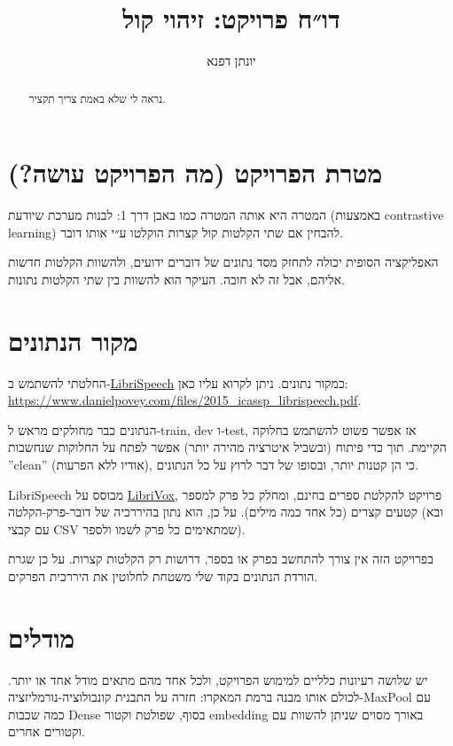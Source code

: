 \documentclass[a4paper]{article}
\title{דו״ח פרויקט: זיהוי קול}
\author{יונתן דפנא}
\begin{document}
\maketitle

\begin{abstract}
  נראה לי שלא באמת צריך תקציר.
\end{abstract}

\section{מטרת הפרויקט (מה הפרויקט עושה?)}
\label{sec:whatisit}

המטרה היא אותה המטרה כמו באבן דרך 1: לבנות מערכת שיודעת (באמצעות
contrastive learning) להבחין אם שתי הקלטות קול קצרות הוקלטו ע״י אותו
דובר.

האפליקציה הסופית יכולה לתחזק מסד נתונים של דוברים ידועים, ולהשוות
הקלטות חדשות אליהם, אבל זה לא חובה. העיקר הוא להשוות בין שתי הקלטות
נתונות.

\section{מקור הנתונים}
\label{sec:dataset}

החלטתי להשתמש ב-\href{https://www.openslr.org/12}{LibriSpeech} כמקור
נתונים. ניתן לקרוא עליו כאן:
\url{https://www.danielpovey.com/files/2015_icassp_librispeech.pdf}.

הנתונים כבר מחולקים מראש ל-train, dev ו-test, אז אפשר פשוט להשתמש
בחלוקה הקיימת. תוך כדי פיתוח (ובשביל איטרציה מהירה יותר) אפשר לפתח על
החלוקות שנחשבות ”clean” (אודיו ללא הפרעות), כי הן קטנות יותר, ובסופו
של דבר לרוץ על כל הנתונים.

LibriSpeech מבוסס על \href{https://librivox.org/}{LibriVox}, פרויקט
להקלטת ספרים בחינם, ומחלק כל פרק למספר קטעים קצרים (כל אחד כמה מילים).
על כן, הוא נתון בהיררכיה של דובר-פרק-הקלטה (ובא עם קבצי CSV שמתאימים
כל פרק לשמו ולספר).

בפרויקט הזה אין צורך להתחשב בפרק או בספר, דרושות רק הקלטות קצרות. על
כן שגרת הורדת הנתונים בקוד שלי משטחת לחלוטין את היררכית הפרקים.

\section{מודלים}
\label{sec:models}

יש שלושה רעיונות כלליים למימוש הפרויקט, ולכל אחד מהם מתאים מודל אחד או
יותר. לכולם אותו מבנה ברמת המאקרו: חזרה על התבנית
קונבולוציה-נורמליזציה-MaxPool עם כמה שכבות Dense בסוף, שפולטת וקטור
embedding באורך מסוים שניתן להשוות עם וקטורים אחרים.
\end{document}
